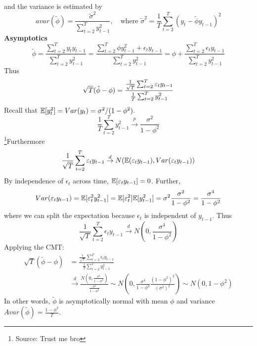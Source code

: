 \documentclass[DIV=14,titlepage=false]{scrreprt}
\begin{document}
and the variance is estimated by 
\[
    avar(\tilde \phi) = \frac{\tilde \sigma^2}{\sum_{t=2}^{T} y_{t-1}^2}, \quad \text{where } \tilde \sigma^2 = \frac{1}{T} \sum_{t=2}^{T} (y_t - \tilde \phi y_{t-1})^2
\]
\textbf{Asymptotics}\\
\[
    \tilde \phi = \frac{\sum_{t=2}^{T} y_t y_{t-1}}{\sum_{t=2}^{T} y_{t-1}^2} = \frac{\sum_{t=2}^{T} \phi y_{t-1}^2 + \epsilon_t y_{t-1}}{\sum_{t=2}^{T} y_{t-1}^2} = \phi + \frac{\sum_{t=2}^{T} \epsilon_t y_{t-1}}{\sum_{t=2}^{T} y_{t-1}^2}
\]
Thus 
\[
    \sqrt{T}(\tilde \phi - \phi) = \frac{\frac{1}{\sqrt{T}}\sum_{t=2}^{T} \epsilon_t y_{t-1}}{\frac{1}{T} \sum_{t=2}^{T} y_{t-1}^2} \\
\]
Recall that $\E[y_t^2] = Var(y_t) = \sigma^2/(1-\phi^2)$.
\[
    \frac{1}{T} \sum_{t=2}^{T} y_{t-1}^2 \overset{p}{\to} \frac{\sigma^2}{1-\phi^2}
\]
\footnote{Source: Trust me bro}Furthermore
\[ 
\frac{1}{\sqrt{T}}\sum_{t=2}^{T} \epsilon_t y_{t-1} \overset{d}{\to} N(\E(\epsilon_t y_{t-1}), Var(\epsilon_t y_{t-1})) 
\]
By independence of $\epsilon_t$ across time, $\E[\epsilon_t y_{t-1}] = 0$. Further,
\[
    Var(\epsilon_t y_{t-1}) = \E[\epsilon_t^2 y_{t-1}^2] = \E[\epsilon_t^2] \E[y_{t-1}^2] = \sigma^2 \frac{\sigma^2}{1-\phi^2} = \frac{\sigma^4}{1-\phi^2}
\]
where we can split the expectation because $\epsilon_t$ is independent of $y_{t-1}$. Thus
\[
    \frac{1}{\sqrt{T}}\sum_{t=2}^{T} \epsilon_t y_{t-1} \overset{d}{\to} N(0, \frac{\sigma^4}{1-\phi^2})
\]
Applying the CMT:
\begin{align*}
    \sqrt{T}(\tilde \phi - \phi) &= \frac{\frac{1}{\sqrt{T}}\sum_{t=2}^{T} \epsilon_t y_{t-1}}{\frac{1}{T} \sum_{t=2}^{T} y_{t-1}^2} \\
    &\overset{d}{\to} \frac{N(0, \frac{\sigma^4}{1-\phi^2})}{\frac{\sigma^2}{1-\phi^2}}
    \sim N\left(0, \frac{\sigma^4}{1-\phi^2} \frac{(1-\phi^2)^2}{(\sigma^2)^2}\right)
    \sim N(0, 1-\phi^2)
\end{align*}
In other words, $\tilde \phi$ is asymptotically normal with mean $\phi$ and variance $Avar(\tilde \phi)  = \frac{1-\phi^2}{T}$.
\end{document}
